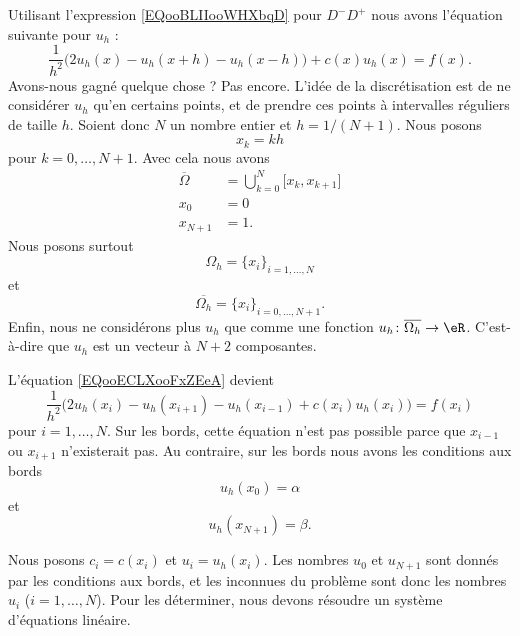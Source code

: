 Utilisant l'expression \eqref{EQooBLIIooWHXbqD} pour \( D^-D^+\) nous avons l'équation suivante pour \( u_h\) :
\begin{equation}        \label{EQooECLXooFxZEeA}
	\frac{1}{ h^2 }\Big( 2u_h(x)-u_h(x+h)-u_h(x-h) \Big)+c(x)u_h(x)=f(x).
\end{equation}
Avons-nous gagné quelque chose ? Pas encore. L'idée de la discrétisation est de ne considérer \( u_h\) qu'en certains points, et de prendre ces points à intervalles réguliers de taille \( h\). Soient donc \( N\) un nombre entier et \( h=1/(N+1)\). Nous posons
\begin{equation}
	x_k=kh
\end{equation}
pour \( k=0,\ldots, N+1\). Avec cela nous avons
\begin{subequations}
	\begin{align}
		\overline{ \Omega } & =\bigcup_{k=0}^{N}\mathopen[ x_k , x_{k+1} \mathclose] \\
		x_0                 & =0                                                     \\
		x_{N+1}             & =1.
	\end{align}
\end{subequations}
Nous posons surtout
\begin{equation}
	\Omega_h=\{ x_i \}_{i=1,\ldots, N}
\end{equation}
et
\begin{equation}
	\overline{ \Omega_h }=\{ x_i \}_{i=0,\ldots, N+1}.
\end{equation}
Enfin, nous ne considérons plus \( u_h\) que comme une fonction \( u_h\colon \overline{ \Omega_h }\to \eR\). C'est-à-dire que \( u_h\) est un vecteur à \( N+2\) composantes.

L'équation \eqref{EQooECLXooFxZEeA} devient
\begin{equation}        \label{EQooZMVMooTqlpkF}
	\frac{1}{ h^2 }\big( 2u_h(x_i)-u_h(x_{i+1})-u_h(x_{i-1})+c(x_i)u_h(x_i) \big)=f(x_i)
\end{equation}
pour \( i=1,\ldots, N\). Sur les bords, cette équation n'est pas possible parce que \( x_{i-1}\) ou \( x_{i+1}\) n'existerait pas. Au contraire, sur les bords nous avons les conditions aux bords
\begin{equation}
	u_h(x_0)=\alpha
\end{equation}
et
\begin{equation}
	u_h(x_{N+1})=\beta.
\end{equation}

Nous posons \( c_i=c(x_i)\) et \( u_i=u_h(x_i)\). Les nombres \( u_0\) et \( u_{N+1}\) sont donnés par les conditions aux bords, et    les inconnues du problème sont donc les nombres \( u_i\) (\( i=1,\ldots, N\)). Pour les déterminer, nous devons résoudre un système d'équations linéaire.

